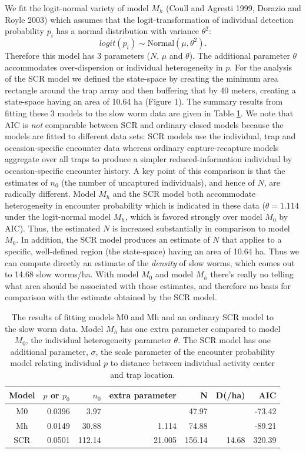 \documentclass{book}
\begin{document}
We fit the logit-normal variety of model $M_h$ (Coull and Agresti
1999, Dorazio and Royle 2003) which assumes that the
logit-transformation of individual detection probability $p_i$ has a
normal distribution with variance $\theta^2$:
\[
 logit(p_i) \sim \mbox{Normal}(\mu, \theta^2).
\]
Therefore this model has 3 parameters ($N$, $\mu$ and $\theta$).  The
additional parameter $\theta$ accommodates over-dispersion or
individual heterogeneity in $p$.
For the analysis of the SCR model we defined
 the state-space by creating the minimum area rectangle around the trap array
and then buffering that by 40 meters, creating a state-space having an
area of 10.64 ha (Figure 1).
The summary results from fitting these 3 models to the slow worm data
are given in Table \ref{tab.results}. We note that
AIC is {\it not} comparable between SCR and ordinary closed models because the
models are fitted to different data sets:
SCR models use the individual, trap and occasion-specific
encounter data whereas ordinary capture-recapture models aggregate
over all traps to produce a simpler reduced-information individual by
occasion-specific encounter history.  A key point of this comparison
is that the estimates of $n_0$ (the number of uncaptured individuals),
and hence of $N$, are radically different. Model $M_h$ and the SCR
model both accommodate heterogeneity in encounter probability which is
indicated in these data ($\theta = 1.114$ under the logit-normal model
$M_h$, which is favored strongly over model $M_0$ by AIC). Thus, the estimated $N$ is increased substantially in
comparison to model $M_0$. In addition, the SCR model produces an
estimate of $N$ that applies to a specific, well-defined region (the
state-space) having an area of 10.64 ha. Thus we can compute directly
an estimate of the {\it density} of slow worms, which comes out to
14.68 slow worms/ha.  With model $M_0$ and model $M_h$ there's really
no telling what area should be associated with those estimates, and
therefore no basis for comparison with the estimate obtained by the
SCR model.


\begin{table}[ht]
\centering
\caption{The results of fitting models M0 and Mh and an ordinary SCR
  model to the slow worm data. Model $M_h$ has one extra parameter
  compared to model $M_0$, the individual heterogeneity parameter
  $\theta$. The SCR model has one additional parameter, $\sigma$, the
  scale parameter of the encounter probability model relating
  individual $p$ to distance between individual activity center and
  trap location. }
\begin{tabular}{crrrrrr}
\toprule
Model & $p$ or $p_0$ &  $n_0$   & extra parameter & N      & D(/ha)  & AIC     \\
\midrule
M0    &  0.0396      & 3.97     &                 & 47.97  &         & -73.42  \\
Mh    &  0.0149      & 30.88    & 1.114           & 74.88  &         & -89.21  \\
SCR   &  0.0501      & 112.14   & 21.005          & 156.14 & 14.68   & 320.39  \\
\bottomrule
\end{tabular}
\label{tab.results}
\end{table}
\end{document}
